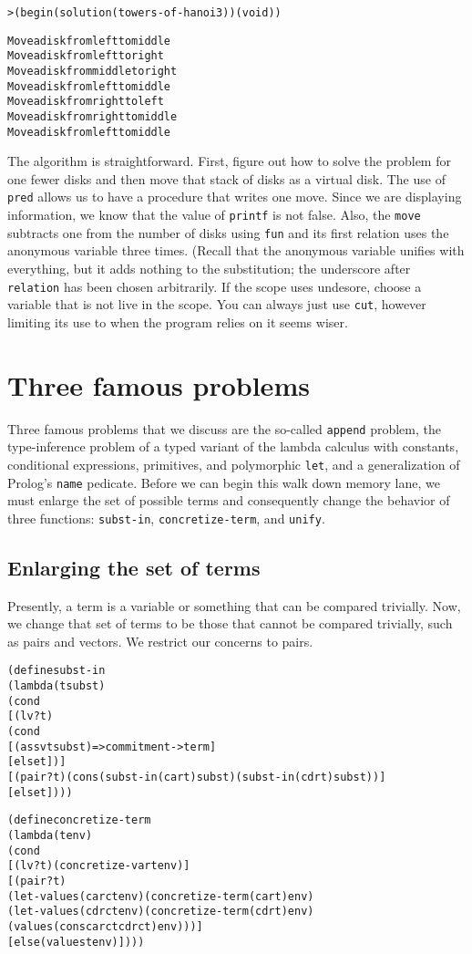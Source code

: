 \begin{alltt}
> (begin (solution (towers-of-hanoi 3)) (void))

Move a disk from left to middle
Move a disk from left to right
Move a disk from middle to right
Move a disk from left to middle
Move a disk from right to left
Move a disk from right to middle
Move a disk from left to middle
\end{alltt}

The algorithm is straightforward. First, figure out how to solve the
problem for one fewer disks and then move that stack of disks as a
virtual disk.  The use of \texttt{pred} allows us to have a procedure
that writes one move.  Since we are displaying information, we know
that the value of \texttt{printf} is not false.  Also, the
\texttt{move} subtracts one from the number of disks using
\texttt{fun} and its first relation uses the anonymous variable three
times.  (Recall that the anonymous variable unifies with everything,
but it adds nothing to the substitution; the underscore after
\texttt{relation} has been chosen arbitrarily.  If the scope uses
undesore, choose a variable that is not live in the scope.  You can
always just use \texttt{cut}, however limiting its use to when the
program relies on it seems wiser.

\section{Three famous problems}

Three famous problems that we discuss are the so-called
\texttt{append} problem, the type-inference problem of a typed variant
of the lambda calculus with constants, conditional expressions,
primitives, and polymorphic \texttt{let}, and a generalization of
Prolog's \texttt{name} pedicate.  Before we can begin this walk down
memory lane, we must enlarge the set of possible terms and
consequently change the behavior of three functions:
\texttt{subst-in}, \texttt{concretize-term}, and \texttt{unify}.
\newpage
\subsection{Enlarging the set of terms}

Presently, a term is a variable or something that can be compared 
trivially.  Now, we change that set of terms to be those that cannot
be compared trivially, such as pairs and vectors.  We restrict our
concerns to pairs.

\begin{alltt}
(define subst-in
  (lambda (t subst)
    (cond
      [(lv? t)
       (cond
         [(assv t subst) => commitment->term]
         [else t])]
      [(pair? t) (cons (subst-in (car t) subst) (subst-in (cdr t) subst))]
      [else t])))

(define concretize-term
  (lambda (t env)
    (cond
      [(lv? t) (concretize-var t env)]
      [(pair? t)
       (let-values (carct env) (concretize-term (car t) env)
         (let-values (cdrct env) (concretize-term (cdr t) env)
           (values (cons carct cdrct) env)))]
      [else (values t env)])))
\end{alltt}

